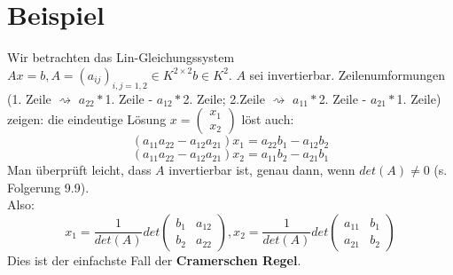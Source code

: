 \documentclass{scrbook}
\begin{document}
\section{Beispiel}
Wir betrachten das Lin-Gleichungssystem $Ax=b, A=(a_{ij})_{i,j=1,2}\in K^{2 \times 2} b \in K^2$. $A$ sei invertierbar. Zeilenumformungen (1. Zeile $\rightsquigarrow$ $a_{22}*$1. Zeile - $a_{12}*$2. Zeile; 2.Zeile $\rightsquigarrow$ $a_{11}*$2. Zeile - $a_{21}*$1. Zeile) zeigen: die eindeutige Lösung $x=\left(
\begin{array}{c}
x_1\\x_2
\end{array}
\right)$ löst auch:\[(a_{11}a_{22}-a_{12}a_{21})x_1=a_{22}b_1-a_{12}b_2\]
\[(a_{11}a_{22}-a_{12}a_{21})x_2=a_{11}b_2-a_{21}b_1\]
Man überprüft leicht, dass $A$ invertierbar ist, genau dann, wenn $det(A) \neq 0$ (s. Folgerung 9.9).\\
Also:\[x_1=\frac{1}{det(A)}det\left(\begin{array}{cc}
b_1&a_{12}\\
b_2&a_{22}
\end{array}
\right),
x_2=\frac{1}{det(A)}det\left(\begin{array}{cc}
a_{11}&b_1\\
a_{21}&b_2
\end{array}
\right)\]
Dies ist der einfachste Fall der \textbf{Cramerschen Regel}.
\end{document}

